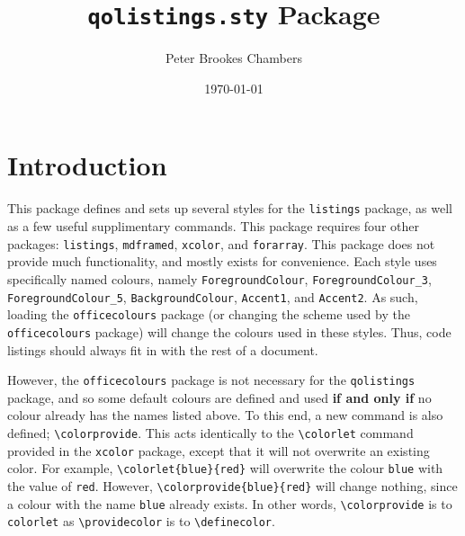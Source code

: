 \documentclass{article}
\title{\texttt{qolistings.sty} Package}
\author{Peter Brookes Chambers}
\date{\today{}}
\begin{document}
\maketitle
\clearpage
\tableofcontents{}
\clearpage
{}
\section{Introduction}

This package defines and sets up several styles for the \texttt{listings} package, as well as a few useful supplimentary commands. This package requires four other packages: \texttt{listings}, \texttt{mdframed}, \texttt{xcolor}, and \texttt{forarray}. This package does not provide much functionality, and mostly exists for convenience. Each style uses specifically named colours, namely \texttt{ForegroundColour}, \texttt{ForegroundColour\_3}, \texttt{ForegroundColour\_5}, \texttt{BackgroundColour}, \texttt{Accent1}, and \texttt{Accent2}. As such, loading the \texttt{officecolours} package (or changing the scheme used by the \texttt{officecolours} package) will change the colours used in these styles. Thus, code listings should always fit in with the rest of a document.

However, the \texttt{officecolours} package is not necessary for the \texttt{qolistings} package, and so some default colours are defined and used \textbf{if and only if} no colour already has the names listed above. To this end, a new command is also defined; \verb|\colorprovide|. This acts identically to the \verb|\colorlet| command provided in the \texttt{xcolor} package, except that it will not overwrite an existing color. For example, \verb|\colorlet{blue}{red}| will overwrite the colour \texttt{blue} with the value of \texttt{red}. However, \verb|\colorprovide{blue}{red}| will change nothing, since a colour with the name \texttt{blue} already exists. In other words, \verb|\colorprovide| is to \verb|colorlet| as \verb|\providecolor| is to \verb|\definecolor|.
\end{document}
